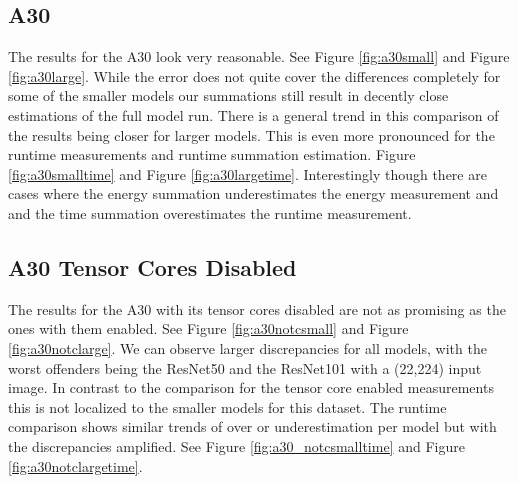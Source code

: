 \documentclass[conference]{IEEEtran}
\begin{document}
\subsection{A30}
The results for the A30 look very reasonable. See Figure \ref{fig:a30small} and Figure \ref{fig:a30large}. While the error does not quite cover the differences completely for some of the smaller models our summations still result in decently close estimations of the full model run. There is a general trend in this comparison of the results being closer for larger models. This is even more pronounced for the runtime measurements and runtime summation estimation. Figure \ref{fig:a30smalltime} and Figure \ref{fig:a30largetime}. Interestingly though there are cases where the energy summation underestimates the energy measurement and and the time summation overestimates the runtime measurement.


\subsection{A30 Tensor Cores Disabled}
The results for the A30 with its tensor cores disabled are not as promising as the ones with them enabled. See Figure \ref{fig:a30notcsmall} and Figure \ref{fig:a30notclarge}. We can observe larger discrepancies for all models, with the worst offenders being the ResNet50 and the ResNet101 with a (22,224) input image. In contrast to the comparison for the tensor core enabled measurements this is not localized to the smaller models for this dataset. The runtime comparison shows similar trends of over or underestimation per model but with the discrepancies amplified. See Figure 
\ref{fig:a30_notcsmalltime} and Figure \ref{fig:a30notclargetime}.
\end{document}
